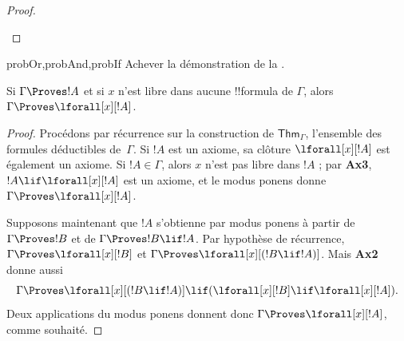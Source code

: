\documentclass[../../../include/open-logic-section]{subfiles}
\begin{document}
\begin{proof}
\begin{enumerate}

\end{enumerate}
\end{proof}

\begin{probtag}{probOr,probAnd,probIf}
Achever la démonstration de la
.
\end{probtag}

\begin{thm}[Généralisation]
Si $\Gamma \Proves !A$ et si $x$ n'est libre dans aucune
!!{formula} de $\Gamma$, alors
$\Gamma \Proves \lforall[x][!A]$.
\end{thm}

\begin{proof}
Procédons par récurrence sur la construction de
$\mathsf{Thm}_\Gamma$, l'ensemble des formules déductibles
de~$\Gamma$. Si $!A$ est un axiome, sa clôture
$\lforall[x][!A]$ est également un axiome. Si $!A\in\Gamma$,
alors $x$ n'est pas libre dans $!A$ ; par \textbf{Ax3},
$!A\lif\lforall[x][!A]$ est un axiome, et le modus ponens
donne $\Gamma\Proves\lforall[x][!A]$.

Supposons maintenant que $!A$ s'obtienne par modus ponens à
partir de $\Gamma\Proves !B$ et de
$\Gamma\Proves !B\lif !A$. Par hypothèse de récurrence,
$\Gamma\Proves\lforall[x][!B]$ et
$\Gamma\Proves\lforall[x][(!B\lif !A)]$. Mais
\textbf{Ax2} donne aussi
\[
\Gamma\Proves
\lforall[x][(!B\lif !A)]
\lif(\lforall[x][!B]\lif\lforall[x][!A]).
\]
Deux applications du modus ponens donnent donc
$\Gamma\Proves\lforall[x][!A]$, comme souhaité.
\end{proof}
\end{document}
